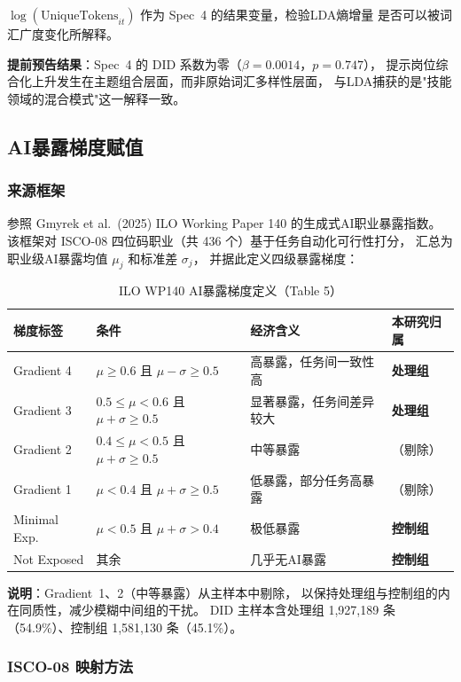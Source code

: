 \documentclass[12pt,a4paper]{ctexart}
\begin{document}
$\log(\text{UniqueTokens}_{it})$ 作为 Spec~4 的结果变量，检验LDA熵增量
是否可以被词汇广度变化所解释。

\textbf{提前预告结果}：Spec~4 的 DID 系数为零（$\beta = 0.0014$，$p = 0.747$），
提示岗位综合化上升发生在主题组合层面，而非原始词汇多样性层面，
与LDA捕获的是"技能领域的混合模式"这一解释一致。

\subsection{AI暴露梯度赋值}

\subsubsection{来源框架}

参照 Gmyrek et al.\ (2025) ILO Working Paper 140 的生成式AI职业暴露指数。
该框架对 ISCO-08 四位码职业（共 436 个）基于任务自动化可行性打分，
汇总为职业级AI暴露均值 $\mu_j$ 和标准差 $\sigma_j$，
并据此定义四级暴露梯度：

\begin{table}[H]
\centering
\caption{ILO WP140 AI暴露梯度定义（Table 5）}
\begin{tabular}{llll}
\toprule
梯度标签 & 条件 & 经济含义 & 本研究归属 \\
\midrule
Gradient 4 & $\mu \geq 0.6$ 且 $\mu - \sigma \geq 0.5$ & 高暴露，任务间一致性高 & \textbf{处理组} \\
Gradient 3 & $0.5 \leq \mu < 0.6$ 且 $\mu + \sigma \geq 0.5$ & 显著暴露，任务间差异较大 & \textbf{处理组} \\
Gradient 2 & $0.4 \leq \mu < 0.5$ 且 $\mu + \sigma \geq 0.5$ & 中等暴露 & （剔除） \\
Gradient 1 & $\mu < 0.4$ 且 $\mu + \sigma \geq 0.5$ & 低暴露，部分任务高暴露 & （剔除） \\
Minimal Exp. & $\mu < 0.5$ 且 $\mu + \sigma > 0.4$ & 极低暴露 & \textbf{控制组} \\
Not Exposed & 其余 & 几乎无AI暴露 & \textbf{控制组} \\
\bottomrule
\end{tabular}
\end{table}

\textbf{说明}：Gradient~1、2（中等暴露）从主样本中剔除，
以保持处理组与控制组的内在同质性，减少模糊中间组的干扰。
DID 主样本含处理组 1,927,189 条（54.9\%）、控制组 1,581,130 条（45.1\%）。

\subsubsection{ISCO-08 映射方法}
\end{document}
